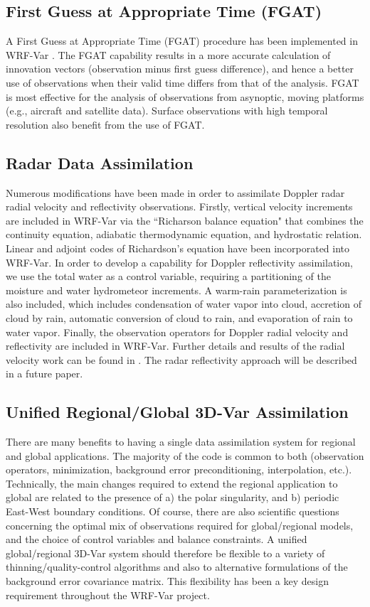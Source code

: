 \subsection{First Guess at Appropriate Time (FGAT)}

A First Guess at Appropriate Time (FGAT) procedure has been implemented in 
WRF-Var \citep{lee04}.
 The FGAT capability results in a more accurate calculation of innovation vectors 
(observation minus first guess difference), and hence a better use of observations when 
their valid time differs from that of the analysis. 
FGAT is most effective for the analysis of observations from 
asynoptic, moving platforms (e.g., aircraft and satellite data). Surface observations with 
high temporal resolution also benefit from the use of FGAT.

\subsection{Radar Data Assimilation}

Numerous modifications have been made in order to assimilate Doppler
radar radial velocity and reflectivity observations. Firstly, vertical
velocity increments are included in WRF-Var via the ``Richarson
balance equation" that combines the continuity equation, adiabatic
thermodynamic equation, and hydrostatic relation. Linear and adjoint
codes of Richardson's equation have been incorporated into WRF-Var. In
order to develop a capability for Doppler reflectivity assimilation,
we use the total water as a control variable, requiring a partitioning
of the moisture and water hydrometeor increments. A warm-rain
parameterization is also included, which includes condensation of
water vapor into cloud, accretion of cloud by rain, automatic
conversion of cloud to rain, and evaporation of rain to water
vapor. Finally, the observation operators for Doppler radial velocity
and reflectivity are included in WRF-Var. Further details and results
of the radial velocity work can be found in \citet{xiao05}. The radar
reflectivity approach will be described in a future paper.

\subsection{Unified Regional/Global 3D-Var Assimilation}

There are many benefits to having a single data assimilation system
for regional and global applications. The majority of the code is
common to both (observation operators, minimization, background error
preconditioning, interpolation, etc.). Technically, the main changes
required to extend the regional application to global are related to
the presence of a) the polar singularity, and b) periodic East-West
boundary conditions. Of course, there are also scientific questions
concerning the optimal mix of observations required for
global/regional models, and the choice of control variables and
balance constraints. A unified global/regional 3D-Var system should
therefore be flexible to a variety of thinning/quality-control
algorithms and also to alternative formulations of the background
error covariance matrix. This flexibility has been a key design
requirement throughout the WRF-Var project.

